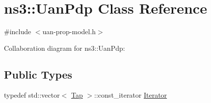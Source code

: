 \hypertarget{classns3_1_1UanPdp}{}\section{ns3\+:\+:Uan\+Pdp Class Reference}
\label{classns3_1_1UanPdp}


{\ttfamily \#include $<$uan-\/prop-\/model.\+h$>$}



Collaboration diagram for ns3\+:\+:Uan\+Pdp\+:
\subsection*{Public Types}
\begin{DoxyCompactItemize}
\item 
typedef std\+::vector$<$ \hyperlink{classns3_1_1Tap}{Tap} $>$\+::const\+\_\+iterator \hyperlink{classns3_1_1UanPdp_a640e546e31696f75f9e638513b38ceba}{Iterator}
\end{DoxyCompactItemize}
